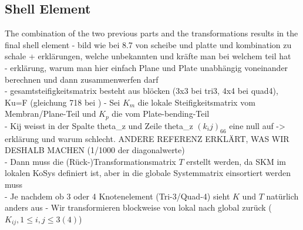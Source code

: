  \subsection{Shell Element}
 The combination of the two previous parts and the transformations results in the final shell element\newline
 - bild wie bei 8.7 von scheibe und platte und kombination zu schale + erklärungen, welche unbekannten und kräfte man bei welchem teil hat\\
 - erklärung, warum man hier einfach Plane und Plate unabhängig voneinander berechnen und dann zusammenwerfen darf\\
 - gesamtsteifigkeitsmatrix besteht aus blöcken (3x3 bei tri3, 4x4 bei quad4), Ku=F (gleichung 718 bei \cite{steinke2005finite})
 - Sei $K_m$ die lokale Steifigkeitsmatrix vom Membran/Plane-Teil und $K_p$ die vom Plate-bending-Teil\\
 - Kij weisst in der Spalte theta\_z und Zeile theta\_z $(k_ij)_66$ eine null auf -> erklärung und warum schlecht. ANDERE REFERENZ ERKLÄRT, WAS WIR DESHALB MACHEN (1/1000 der diagonalwerte)\\
 - Dann muss die (Rück-)Transformationsmatrix $T$ erstellt werden, da SKM im lokalen KoSys definiert ist, aber in die globale Systemmatrix einsortiert werden muss\\
 - Je nachdem ob 3 oder 4 Knotenelement (Tri-3/Quad-4) sieht $K$ und $T$ natürlich anders aus\newline
 - Wir transformieren blockweise von lokal nach global zurück ($K_{ij}, 1 \leq i,j \leq 3(4)$)\newline
 \newpage